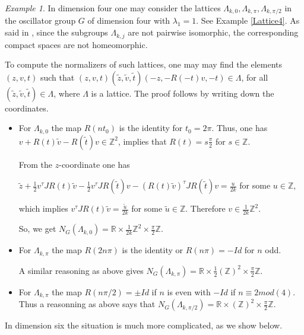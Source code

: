 \documentclass[11pt]{amsart}
\theoremstyle{plain}
\theoremstyle{definition}
\theoremstyle{remark}
\newtheorem{exa}[thm]{Example}
\begin{document}
	\begin{exa}
	In dimension four one may consider the lattices $\Lambda_{k,0}, \Lambda_{k,\pi}, \Lambda_{k,\pi/2}$ in the oscillator group $G$ of dimension four with $\lambda_1=1$. See Example \ref{Lattice4}. As said in \cite{BOV}, since the subgroups $\Lambda_{k,j}$ are not pairwise isomorphic, the corresponding compact spaces are not homeomorphic. 
	
	
To	compute the normalizers of such lattices, one may  may find the elements $(z,v,t)$ such  that
	$(z,v,t)(\tilde{z},\tilde{v},\tilde{t})(-z,-R(-t)v,-t)\in \Lambda$, for  all $(\tilde{z},\tilde{v},\tilde{t})\in \Lambda$, where $\Lambda$ is a lattice. The proof follows by writing down the coordinates. 
	\begin{itemize}
			\item For $\Lambda_{k,0}$ the map $R(nt_0)$ is the identity for $t_0=2\pi$. Thus, one has $v+R(t)\tilde{v}-R(\tilde{t})v\in \mathbb Z^2$, implies that $R(t)=s\frac{\pi}2$ for $s\in \mathbb Z$.
			
			From the $z$-coordinate one has 
			
			\smallskip
			
			$\tilde{z}+\frac12 v^{\tau} JR(t)\tilde{v} -\frac12 v^{\tau} J R(\tilde{t})v-(R(t)\tilde{v})^{\tau}JR(\tilde{t})v= \frac{u}{2k}$ for some $u\in \mathbb Z$,
			
			\smallskip
			
			which implies $v^{\tau}JR(t)\tilde{v}=\frac{\tilde{u}}{2k}$ for some $\tilde{u}\in \mathbb Z$. Therefore $v\in \frac{1}{2k}\mathbb Z^2$. 
			
			So, we get $N_G(\Lambda_{k,0})=\mathbb R\times \frac{1}{2k}\mathbb Z^2\times \frac{\pi}2 \mathbb Z$. 
			
			\item For $\Lambda_{k,\pi}$ the map $R(2n\pi)$ is the identity  or $R(n\pi)=-Id$ for $n$ odd.
			
			A similar reasoning as above gives $N_G(\Lambda_{k,\pi})=\mathbb R\times \frac{1}{2}(\mathbb Z)^2\times \frac{\pi}2 \mathbb Z$.	
		 \item For $\Lambda_{k,\pi}$ the map $R(n\pi/2)=\pm Id$ if $n$ is even with $-Id$ if $n\equiv 2 mod(4)$. Thus a reasonning as above says that
			$N_G(\Lambda_{k,\pi/2})=\mathbb R\times (\mathbb Z)^2 \times \frac{\pi}2 \mathbb Z$.
		\end{itemize}
	In dimension six the situation is much more complicated, as we show below. 
	\end{exa}
\end{document}
